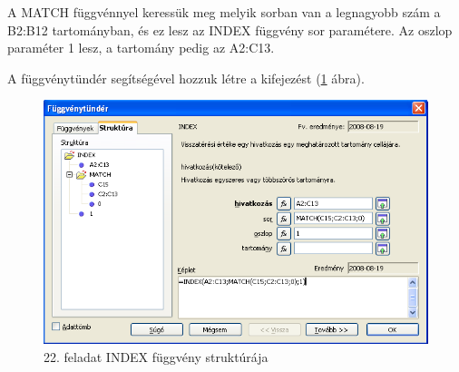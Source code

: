 A MATCH függvénnyel keressük meg melyik sorban van a legnagyobb
szám a B2:B12 tartományban, és ez lesz az INDEX függvény sor
paramétere. Az oszlop paraméter 1 lesz, a tartomány pedig az
A2:C13.

A függvénytündér segítségével hozzuk létre a
kifejezést (\ref{INDEXFüggvény} ábra).

\begin{figure}[!h]
\begin{center}
\includegraphics[width=15.999cm]{oocalcv1-img103.png}
\caption{22. feladat INDEX függvény struktúrája}\label{INDEXFüggvény}
\end{center}
\end{figure}

